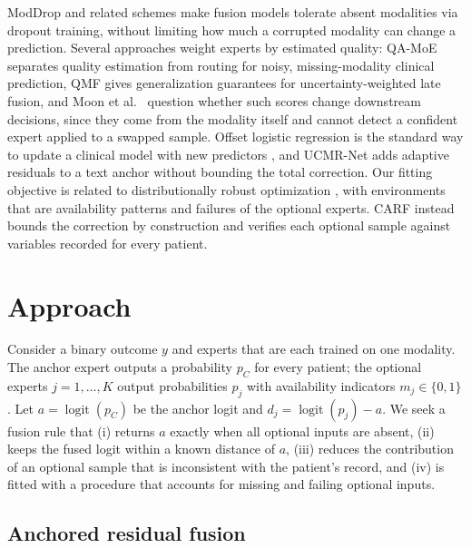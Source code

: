 \documentclass[a4paper,runningheads]{llncs}
\newcommand{\logit}{\operatorname{logit}}
\begin{document}
ModDrop \cite{neverova2015} and related schemes \cite{ma2021smil} make fusion models tolerate absent modalities via dropout training, without limiting how much a corrupted modality can change a prediction. Several approaches weight experts by estimated quality: QA-MoE \cite{sun2026} separates quality estimation from routing for noisy, missing-modality clinical prediction, QMF \cite{zhang2023qmf} gives generalization guarantees for uncertainty-weighted late fusion, and Moon et al.~\cite{moon2026} question whether such scores change downstream decisions, since they come from the modality itself and cannot detect a confident expert applied to a swapped sample. Offset logistic regression is the standard way to update a clinical model with new predictors \cite{janssen2008}, and UCMR-Net \cite{tang2026} adds adaptive residuals to a text anchor without bounding the total correction. Our fitting objective is related to distributionally robust optimization \cite{sagawa2020}, with environments that are availability patterns and failures of the optional experts. CARF instead bounds the correction by construction and verifies each optional sample against variables recorded for every patient.

\section{Approach}

Consider a binary outcome $y$ and experts that are each trained on one modality. The anchor expert outputs a probability $p_C$ for every patient; the optional experts $j=1,\dots,K$ output probabilities $p_j$ with availability indicators $m_j\in\{0,1\}$. Let $a=\logit(p_C)$ be the anchor logit and $d_j=\logit(p_j)-a$. We seek a fusion rule that (i) returns $a$ exactly when all optional inputs are absent, (ii) keeps the fused logit within a known distance of $a$, (iii) reduces the contribution of an optional sample that is inconsistent with the patient's record, and (iv) is fitted with a procedure that accounts for missing and failing optional inputs.

\subsection{Anchored residual fusion}
\end{document}
